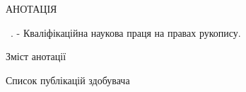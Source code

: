 \noindent
АНОТАЦІЯ						

\vspace{0.7cm}
\noindent
\thesisAuthorFIO~\thesisTitle. - Кваліфікаційна наукова праця на правах рукопису.

\vspace{0.7cm}
\noindent
\abstractBegin

\vspace{0.7cm}
Зміст анотації

\vspace{0.7cm}
\noindent
\keywords

\vspace{0.7cm}
Список публікацій здобувача



\clearpage
